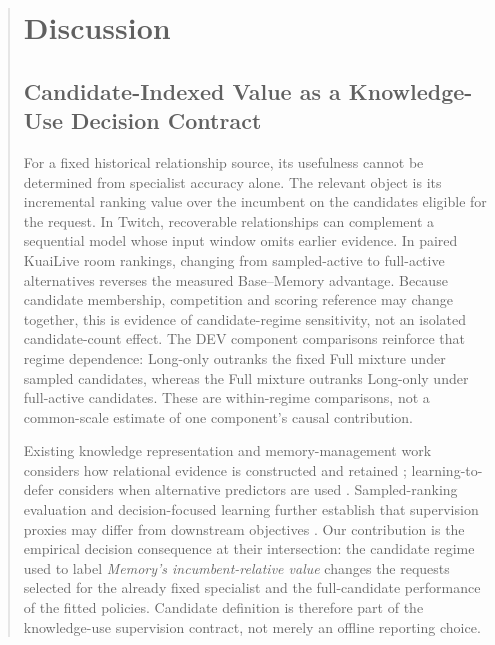 \begin{abstract}
\section{Discussion}
\label{sec:discussion}

\subsection{Candidate-Indexed Value as a Knowledge-Use Decision Contract}
\label{sec:discussion-values}

For a fixed historical relationship source, its usefulness cannot be determined from specialist accuracy alone. The relevant object is its incremental ranking value over the incumbent on the candidates eligible for the request. In Twitch, recoverable relationships can complement a sequential model whose input window omits earlier evidence. In paired KuaiLive room rankings, changing from sampled-active to full-active alternatives reverses the measured Base--Memory advantage. Because candidate membership, competition and scoring reference may change together, this is evidence of candidate-regime sensitivity, not an isolated candidate-count effect. The DEV component comparisons reinforce that regime dependence: Long-only outranks the fixed Full mixture under sampled candidates, whereas the Full mixture outranks Long-only under full-active candidates. These are within-regime comparisons, not a common-scale estimate of one component's causal contribution.

Existing knowledge representation and memory-management work considers how relational evidence is constructed and retained \cite{xie2026mhgfcl,zhong2026samd}; learning-to-defer considers when alternative predictors are used \cite{mozannar2020defer,mao2024regression}. Sampled-ranking evaluation and decision-focused learning further establish that supervision proxies may differ from downstream objectives \cite{krichene2020kdd,mandi2024decisionfocused}. Our contribution is the empirical decision consequence at their intersection: the candidate regime used to label \emph{Memory's incumbent-relative value} changes the requests selected for the already fixed specialist and the full-candidate performance of the fitted policies. Candidate definition is therefore part of the knowledge-use supervision contract, not merely an offline reporting choice.


\end{abstract}
